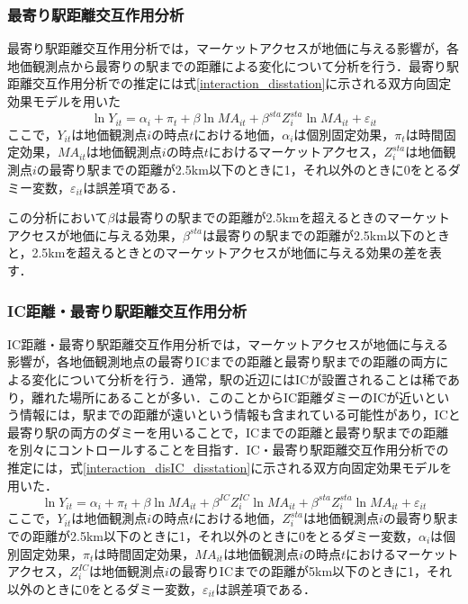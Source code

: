 \subsubsection{最寄り駅距離交互作用分析}
最寄り駅距離交互作用分析では，マーケットアクセスが地価に与える影響が，各地価観測点から最寄りの駅までの距離による変化について分析を行う．最寄り駅距離交互作用分析での推定には式\ref{interaction_disstation}に示される双方向固定効果モデルを用いた
\begin{equation}
  \ln{Y_{it}} = \alpha_{i} + \pi_{t} + \beta\ln{MA_{it}} + \beta^{sta}Z^{sta}_{i}\ln{MA_{it}} + \varepsilon_{it}
  \label{interaction_disstation}
\end{equation}
ここで，$Y_{it}$は地価観測点$i$の時点$t$における地価，$\alpha_{i}$は個別固定効果，$\pi_{t}$は時間固定効果，$MA_{it}$は地価観測点$i$の時点$t$におけるマーケットアクセス，$Z^{sta}_{i}$は地価観測点$i$の最寄り駅までの距離が2.5km以下のときに1，それ以外のときに0をとるダミー変数，$\varepsilon_{it}$は誤差項である．

この分析において$\beta$は最寄りの駅までの距離が2.5kmを超えるときのマーケットアクセスが地価に与える効果，$\beta^{sta}$は最寄りの駅までの距離が2.5km以下のときと，2.5kmを超えるときとのマーケットアクセスが地価に与える効果の差を表す．
\subsubsection{IC距離・最寄り駅距離交互作用分析}
IC距離・最寄り駅距離交互作用分析では，マーケットアクセスが地価に与える影響が，各地価観測地点の最寄りICまでの距離と最寄り駅までの距離の両方による変化について分析を行う．通常，駅の近辺にはICが設置されることは稀であり，離れた場所にあることが多い．このことからIC距離ダミーのICが近いという情報には，駅までの距離が遠いという情報も含まれている可能性があり，ICと最寄り駅の両方のダミーを用いることで，ICまでの距離と最寄り駅までの距離を別々にコントロールすることを目指す．IC・最寄り駅距離交互作用分析での推定には，式\ref{interaction_disIC_disstation}に示される双方向固定効果モデルを用いた．
\begin{equation}
  \ln{Y_{it}} = \alpha_{i} + \pi_{t} + \beta\ln{MA_{it}} + \beta^{IC}Z^{IC}_{i}\ln{MA_{it}} + \beta^{sta}Z^{sta}_{i}\ln{MA_{it}} + \varepsilon_{it}
  \label{interaction_disIC_disstation}
\end{equation}
ここで，$Y_{it}$は地価観測点$i$の時点$t$における地価，$Z^{sta}_{i}$は地価観測点$i$の最寄り駅までの距離が2.5km以下のときに1，それ以外のときに0をとるダミー変数，$\alpha_{i}$は個別固定効果，$\pi_{t}$は時間固定効果，$MA_{it}$は地価観測点$i$の時点$t$におけるマーケットアクセス，$Z^{IC}_{i}$は地価観測点$i$の最寄りICまでの距離が5km以下のときに1，それ以外のときに0をとるダミー変数，$\varepsilon_{it}$は誤差項である．

